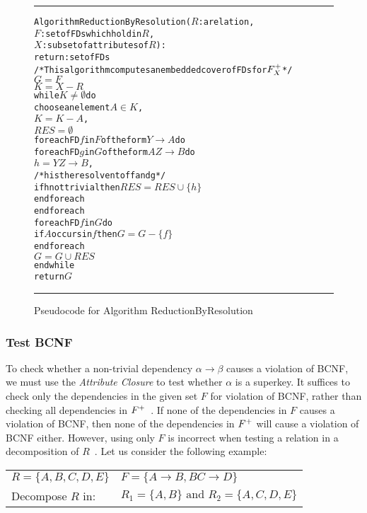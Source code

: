 \begin{figure}[htbp]
\hrule
\begin{alltt}

Algorithm ReductionByResolution(\(R\): a relation,
                  \(F\) : set of FDs which hold in \(R\),
                  \(X\) : subset of attributes of \(R\)):
             return: set of FDs
/* This algorithm computes an embedded cover of FDs for \(F\sb{X}\sp{+}\) */
  \(G = F\)
  \(K = X - R\)
  while \(K \neq \emptyset\) do
    choose an element \(A \in K\),
    \(K = K - A\),
    \(RES = \emptyset\)
    foreach FD \(f\) in \(F\) of the form \(Y \rightarrow A\) do
      foreach FD \(g\) in \(G\) of the form \(AZ \rightarrow B\) do
        \(h = YZ \rightarrow B\),
        /* h is the resolvent of f and g */
        if h not trivial then \(RES = RES \cup \{h\}\)
      end foreach
    end foreach
    foreach FD \(f\) in \(G\) do
      if \(A\) occurs in \(f\) then \(G = G - \{f\}\)
    end foreach
    \(G = G \cup RES\)
  end while
  return \(G\)
\end{alltt}
\caption{Pseudocode for Algorithm ReductionByResolution}\label{alg:rbr}
\hrule
\end{figure}

\subsubsection{Test BCNF}
To check whether a non-trivial dependency $\alpha \rightarrow \beta$  causes a violation of BCNF,
we must use the \textit{Attribute Closure} to test whether $\alpha$ is a superkey. 
It suffices to check only the dependencies in the given set $F$ for violation of BCNF, 
rather than checking all dependencies in $F\sp{+}$~\cite{bdb4}.  
If none of the dependencies in $F$ causes a violation of BCNF, 
then none of the dependencies in $F\sp{+}$ will cause a violation of BCNF either.
However, using only $F$ is incorrect when testing a relation in a decomposition of $R$~\cite{bdb4}.
Let us consider the following example:

\begin{center}
\begin{tabular}[h]{l l}
  $R = \{A, B, C, D, E\}$ & $F = \{A \rightarrow B, BC \rightarrow D\}$ \\
  Decompose $R$ in:  & $R_1 = \{A, B\} \mbox{ and } R_2 = \{A, C, D, E\}$ \\ 
\end{tabular}
\end{center}

